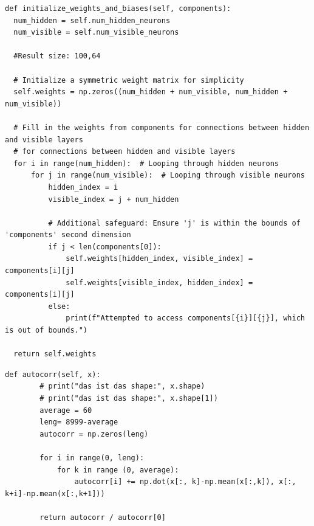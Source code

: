 \label{attachement:weight_matrix}
\begin{lstlisting}
def initialize_weights_and_biases(self, components):
  num_hidden = self.num_hidden_neurons
  num_visible = self.num_visible_neurons

  #Result size: 100,64

  # Initialize a symmetric weight matrix for simplicity
  self.weights = np.zeros((num_hidden + num_visible, num_hidden + num_visible))

  # Fill in the weights from components for connections between hidden and visible layers
  # for connections between hidden and visible layers
  for i in range(num_hidden):  # Looping through hidden neurons
      for j in range(num_visible):  # Looping through visible neurons
          hidden_index = i
          visible_index = j + num_hidden

          # Additional safeguard: Ensure 'j' is within the bounds of 'components' second dimension
          if j < len(components[0]):
              self.weights[hidden_index, visible_index] = components[i][j]
              self.weights[visible_index, hidden_index] = components[i][j]
          else:
              print(f"Attempted to access components[{i}][{j}], which is out of bounds.")

  return self.weights
\end{lstlisting}

\label{attachement:autocorrelation}
\begin{lstlisting}
def autocorr(self, x):
        # print("das ist das shape:", x.shape)
        # print("das ist das shape:", x.shape[1])
        average = 60
        leng= 8999-average
        autocorr = np.zeros(leng)
        
        for i in range(0, leng):
            for k in range (0, average):
                autocorr[i] += np.dot(x[:, k]-np.mean(x[:,k]), x[:, k+i]-np.mean(x[:,k+1])) 

        return autocorr / autocorr[0]
\end{lstlisting}


